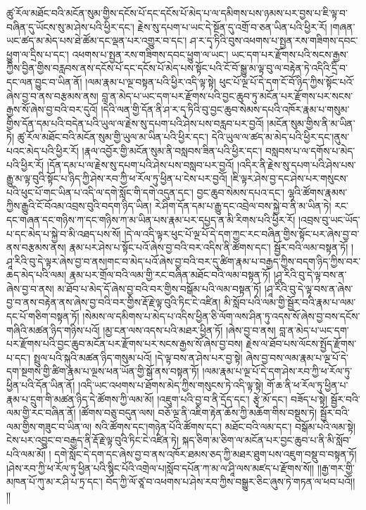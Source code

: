 ཚུ་རོལ་མཐོང་བའི་མངོན་སུམ་གྱིས་དངོས་པོ་དང་དངོས་པོ་མེད་པ་ལ་དམིགས་པས་ཉམས་པར་བྱས་པ་ཇི་ལྟ་བ་བཞིན་དུ་ཡོངས་སུ་མ་ཤེས་པའི་ཕྱིར་དང་། རྗེས་སུ་དཔག་པ་ཡང་དེ་སྔོན་དུ་འགྲོ་བ་ཅན་ཡིན་པའི་ཕྱིར་རོ། །གཞན་ཡང་ཚད་མ་མེད་པས་ཐེ་ཚོམ་དང་ལྡན་པར་འགྱུར་བ་དང་། ཤ་ར་དྭ་ཏིའི་བུས་འཕགས་པ་སྤྱན་རས་གཟིགས་དབང་ཕྱུག་ལ་དྲིས་པ་དང་། འཕགས་པ་སྤྱན་རས་གཟིགས་དབང་ཕྱུག་ལ་ཡང་། ཡང་དག་པར་རྫོགས་པའི་སངས་རྒྱས་ཀྱིས་བྱིན་གྱིས་བརླབས་ནས་དངོས་པོ་དང་དངོས་པོ་མེད་པས་སྟོང་པའི་ངོ་བོ་སྒྱུ་མ་ལྟ་བུ་ལ་བརྟེན་ཏེ་འདིའི་དྲི་བ་དང་ལན་བྱུང་བ་ཡིན་ནོ། །ལམ་རྣམ་པ་ལྔ་བསྟན་པའི་ཕྱིར་འདི་ལྟ་སྟེ། ཕུང་པོ་ལྔ་པོ་དེ་དག་ངོ་བོ་ཉིད་ཀྱིས་སྟོང་པའོ་ཞེས་བྱ་བ་ནས་བརྩམས་ནས། བླ་ན་མེད་པ་ཡང་དག་པར་རྫོགས་པའི་བྱང་ཆུབ་ཏུ་མངོན་པར་རྫོགས་པར་སངས་རྒྱས་སོ་ཞེས་བྱ་བའི་བར་དུའོ། །དེའི་ལན་གྱི་དོན་ནི་ཤ་ར་དྭ་ཏིའི་བུ་བྱང་ཆུབ་སེམས་དཔའི་འཁོར་རྣམ་པ་གསུམ་གྱིས་དོན་དམ་པའི་བདེན་པའི་ཡུལ་ལ་རྗེས་སུ་དཔག་པའི་ཤེས་པས་བརླབ་པར་བྱའོ། །མངོན་སུམ་གྱིས་ནི་མ་ཡིན་ཏེ། ཚུ་རོལ་མཐོང་བའི་མངོན་སུམ་གྱི་ཡུལ་མ་ཡིན་པའི་ཕྱིར་དང་། དེའི་ཡུལ་ལ་ཚད་མ་མེད་པའི་ཕྱིར་དང་།ནུས་པའང་མེད་པའི་ཕྱིར་རོ། །རྣལ་འབྱོར་གྱི་མངོན་སུམ་ནི་བསླབས་ཟིན་པའི་ཕྱིར་དང་། བསླབས་པ་ལ་དགོས་པ་མེད་པའི་ཕྱིར་རོ། །དོན་དམ་པ་ལ་རྗེས་སུ་དཔག་པའི་ཤེས་པས་བསླབ་པར་བྱའོ། །འདིར་ནི་རྗེས་སུ་དཔག་པའི་ཤེས་པས་རྒྱུ་མ་ལྟ་བུའི་སྟོང་པ་ཉིད་ཀྱི་ཤེས་རབ་ཀྱི་ཕ་རོལ་ཏུ་ཕྱིན་པ་ངེས་པར་བྱའོ། །ཇི་ལྟར་ཤེས་བྱ་དང་ཤེས་པར་གསུངས་པའི་ཕུང་པོ་གང་ཡིན་པ་འདི་ལ་དགེ་སློང་གི་དགེ་འདུན་དང་། བྱང་ཆུབ་སེམས་དཔའ་དང་། ལྷའི་ཚོགས་རྣམས་ཀྱིས་རྒྱུའི་ངོ་བོའམ་འབྲས་བུའི་བདག་ཉིད་ཡིན། རེ་ཤིག་དོན་དམ་པ་རྒྱུ་དང་འབྲེལ་བས་སྐྱེ་བ་ནི་མ་ཡིན་ཏེ། རང་དང་གཞན་དང་གཉིས་ཀ་དང་གཉིས་ཀ་མ་ཡིན་པས་རྣམ་པར་དཔྱད་ན་མི་རིགས་པའི་ཕྱིར་རོ། །འབྲས་བུ་ཡང་ཡོད་པ་དང་མེད་པ་སྐྱེ་བ་མི་འཐད་པས་སོ། །དེ་ལ་འདི་ལྟར་ཕུང་པོ་ལྔ་པོ་དེ་དག་ཀྱང་རང་བཞིན་གྱིས་སྟོང་པར་ཞེས་བྱ་བ་ནས་བརྩམས་ནས། རྣམ་པར་ཤེས་པ་སྟོང་པའོ་ཞེས་བྱ་བའི་བར་འདིས་ནི་ཚོགས་དང་། སྦྱོར་བའི་ལམ་བསྟན་ཏོ། །ཤཱ་རིའི་བུ་དེ་ལྟར་ཞེས་བྱ་བ་ནས།གང་བ་མེད་པའོ་ཞེས་བྱ་བའི་བར་དུ་ཚིག་རྣམ་པ་བརྒྱད་ཀྱིས་བདག་ཉིད་ཀྱིས་བར་ཆད་མེད་པའི་ལམ། རྣམ་པར་གྲོལ་བའི་ལམ་གྱི་རང་བཞིན་མཐོང་བའི་ལམ་བསྟན་ཏོ། །ཤཱ་རིའི་བུ་དེ་ལྟ་བས་ན་ཞེས་བྱ་བ་ནས། མ་ཐོབ་པ་མེད་དོ་ཞེས་བྱ་བའི་བར་གྱིས་བསྒོམ་པའི་ལམ་བསྟན་ཏོ། །ཤཱ་རིའི་བུ་དེ་ལྟ་བས་ན་ཞེས་བྱ་བ་ནས་བརྟེན་ནས་ཞེས་བྱ་བའི་བར་གྱིས་རྡོ་རྗེ་ལྟ་བུའི་ཏིང་ངེ་འཛིན། མི་སློབ་པའི་ལམ་གྱི་སྦྱོར་བའི་རྣམ་པ་ལམ་དང་པོ་གཅིག་བསྟན་ཏོ། །སེམས་ལ་དམིགས་པ་མེད་པ་འདིས་ཕྱིན་ཅི་ལོག་ལས་ཤིན་ཏུ་འདས་སོ་ཞེས་བྱ་བས་དངོས་གཞིའི་མཚན་ཉིད་གཉིས་པའོ། །མྱ་ངན་ལས་འདས་པའི་མཐར་ཕྱིན་ཏོ། །ཞེས་བྱ་བ་ནས། བླ་ན་མེད་པ་ཡང་དག་པར་རྫོགས་པའི་བྱང་ཆུབ་མངོན་པར་རྫོགས་པར་སངས་རྒྱས་སོ་ཞེས་བྱ་བས། རྗེས་ལ་ཐོབ་པས་ལོངས་སྤྱོད་རྫོགས་པ་དང་། སྤྲུལ་པའི་སྐུའི་མཚན་ཉིད་གསུམ་པའོ། །དེ་ལྟ་བས་ན་ཤེས་པར་བྱ་སྟེ། ཞེས་བྱ་བས་ལམ་རྣམ་པ་ལྔ་པོ་དེ་དག་སྔགས་གྱི་ཚིག་རྣམ་པ་ལྔས་ཕན་ཡོན་གྱི་སྒོ་ནས་བསྟན་ཏོ། །ལམ་རྣམ་པ་ལྔ་པོ་དེ་དག་ཤེས་རབ་ཀྱི་ཕ་རོལ་ཏུ་ཕྱིན་པའི་དོན་ཡིན་ནོ། །འདི་ཡང་འཕགས་པ་ཐོགས་མེད་ཀྱིས་གསུངས་ཏེ་འདི་ལྟ་སྟེ། གོ་ཆ་ནི་ཕ་རོལ་ཏུ་ཕྱིན་པ་རྣམ་པ་དྲུག་གི་མཚན་ཉིད་དེ་ཚོགས་ཀྱི་ལམ་མོ། །འཇུག་པའི་བྱ་བ་ནི་དྲོད་དང་། རྩྭེ་མོ་དང་། བཟོད་པ་སྟེ། སྦྱོར་བའི་ལམ་གྱི་རང་བཞིན་ནོ། །ཚོགས་བཅུ་བདུན་ལས། བཅོ་ལྔ་ནི་འཇིག་རྟེན་ཆོས་ཀྱི་མཆོག་གིས་བསྡུས་ཏེ། སྦྱོར་བའི་ལམ་གྱིས་གཟུང་བ་ཡིན་ལ། སའི་ཚོགས་དང་།གཉེན་པོའི་ཚོགས་དང་། མཐོང་བའི་ལམ་དང་། བསྒོམ་པའི་ལམ་སྟེ།ངེས་པར་འབྱུང་བ་བརྒྱད་ནི་རྡོ་རྗེ་ལྟ་བུའི་ཏིང་ངེ་འཛིན་ཏེ། སྐད་ཅིག་མ་ཅིག་ལ་མངོན་པར་བྱང་ཆུབ་པ་ནི་མི་སློབ་པའི་ལམ་མོ། །
དགེ་སློང་དེ་དག་དང་ཞེས་བྱ་བ་ནས་འཁོར་ཐམས་ཅད་ཀྱི་མཐར་ཐུག་པས་འཇུག་བསྡུ་བ་བསྟན་ཏོ། །ཤེས་རབ་ཀྱི་ཕ་རོལ་ཏུ་ཕྱིན་པའི་སྙིང་པོའི་འགྲེལ་པ།སློབ་དཔོན་ཀ་མ་ལ་ཤཱི་ལས་མཛད་པ་རྫོགས་སོ།། །།རྒྱ་གར་གྱི་མཁན་པོ་ཀུ་མ་ར་ཤི་པ་ཏྲ་དང་། བོད་ཀྱི་ལོ་ཙཱ་བ་འཕགས་པ་ཤེས་རབ་ཀྱིས་བསྒྱུར་ཅིང་ཞུས་ཏེ་གཏན་ལ་ཕབ་པའོ།། །།